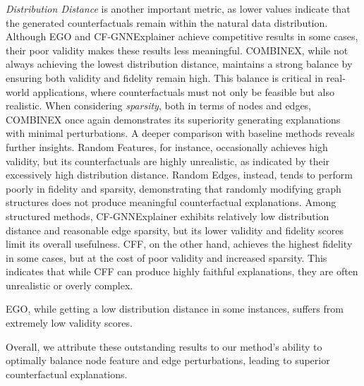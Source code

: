 \textit{Distribution Distance} is another important metric, as lower values indicate that the generated counterfactuals remain within the natural data distribution. Although EGO and CF-GNNExplainer achieve competitive results in some cases, their poor validity makes these results less meaningful. COMBINEX, while not always achieving the lowest distribution distance, maintains a strong balance by ensuring both validity and fidelity remain high. This balance is critical in real-world applications, where counterfactuals must not only be feasible but also realistic. When considering \textit{sparsity}, both in terms of nodes and edges, COMBINEX once again demonstrates its superiority generating explanations with minimal perturbations. 
A deeper comparison with baseline methods reveals further insights. Random Features, for instance, occasionally achieves high validity, but its counterfactuals are highly unrealistic, as indicated by their excessively high distribution distance. 
Random Edges, instead, tends to perform poorly in fidelity and sparsity, demonstrating that randomly modifying graph structures does not produce meaningful counterfactual explanations. Among structured methods, CF-GNNExplainer exhibits relatively low distribution distance and reasonable edge sparsity, but its lower validity and fidelity scores limit its overall usefulness. CFF, on the other hand, achieves the highest fidelity in some cases, but at the cost of poor validity and increased sparsity. This indicates that while CFF can produce highly faithful explanations, they are often unrealistic or overly complex.

EGO, while getting a low distribution distance in some instances, suffers from extremely low validity scores.

Overall, we attribute these outstanding results to our method's ability to optimally balance node feature and edge perturbations, leading to superior counterfactual explanations.


